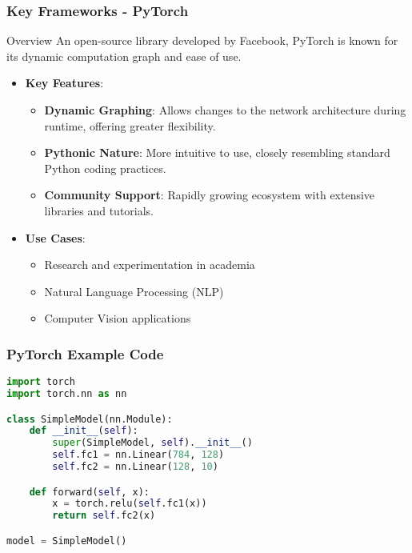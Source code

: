 \documentclass[aspectratio=169]{beamer}
\begin{document}
\begin{frame}
    \frametitle{Key Frameworks - PyTorch}
    \begin{block}{Overview}
        An open-source library developed by Facebook, PyTorch is known for its 
        dynamic computation graph and ease of use.
    \end{block}
    
    \begin{itemize}
        \item \textbf{Key Features}:
        \begin{itemize}
            \item \textbf{Dynamic Graphing}: Allows changes to the network 
                  architecture during runtime, offering greater flexibility.
            \item \textbf{Pythonic Nature}: More intuitive to use, closely 
                  resembling standard Python coding practices.
            \item \textbf{Community Support}: Rapidly growing ecosystem with 
                  extensive libraries and tutorials.
        \end{itemize}
        \item \textbf{Use Cases}:
        \begin{itemize}
            \item Research and experimentation in academia
            \item Natural Language Processing (NLP)
            \item Computer Vision applications
        \end{itemize}
    \end{itemize}
\end{frame}

\begin{frame}[fragile]
    \frametitle{PyTorch Example Code}
    \begin{lstlisting}[language=Python]
import torch
import torch.nn as nn

class SimpleModel(nn.Module):
    def __init__(self):
        super(SimpleModel, self).__init__()
        self.fc1 = nn.Linear(784, 128)
        self.fc2 = nn.Linear(128, 10)

    def forward(self, x):
        x = torch.relu(self.fc1(x))
        return self.fc2(x)

model = SimpleModel()
    \end{lstlisting}
\end{frame}
\end{document}
